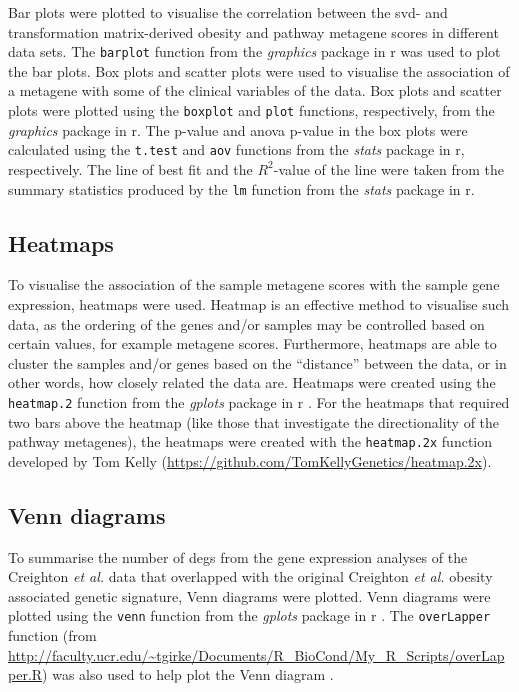 Bar plots were plotted to visualise the correlation between the \gls{svd}- and transformation matrix-derived obesity and pathway metagene scores in different data sets.
The \texttt{barplot} function from the \textit{graphics} package in \gls{r} was used to plot the bar plots.
Box plots and scatter plots were used to visualise the association of a metagene with some of the clinical variables of the data.
Box plots and scatter plots were plotted using the \texttt{boxplot} and \texttt{plot} functions, respectively, from the \textit{graphics} package in \gls{r}.
The p-value and \gls{anova} p-value in the box plots were calculated using the \texttt{t.test} and \texttt{aov} functions from the \textit{stats} package in \gls{r}, respectively.
The line of best fit and the $R^2$-value of the line were taken from the summary statistics produced by the \texttt{lm} function from the \textit{stats} package in \gls{r}.

\subsection{Heatmaps}
\label{sub:heatmaps}

To visualise the association of the sample metagene scores with the sample gene expression, heatmaps were used.
Heatmap is an effective method to visualise such data, as the ordering of the genes and/or samples may be controlled based on certain values, for example metagene scores.
Furthermore, heatmaps are able to cluster the samples and/or genes based on the ``distance'' between the data, or in other words, how closely related the data are.
Heatmaps were created using the \texttt{heatmap.2} function from the \textit{gplots} package in \gls{r} \citep{gplots}.
For the heatmaps that required two bars above the heatmap (like those that investigate the directionality of the pathway metagenes), the heatmaps were created with the \texttt{heatmap.2x} function developed by Tom Kelly (\url{https://github.com/TomKellyGenetics/heatmap.2x}).

\subsection{Venn diagrams}
\label{sub:venn_diagrams}

To summarise the number of \glspl{deg} from the gene expression analyses of the Creighton \textit{et al.} data that overlapped with the original Creighton \textit{et al.} obesity associated genetic signature, Venn diagrams were plotted.
Venn diagrams were plotted using the \texttt{venn} function from the \textit{gplots} package in \gls{r} \citep{gplots}.
The \texttt{overLapper} function (from \url{http://faculty.ucr.edu/~tgirke/Documents/R_BioCond/My_R_Scripts/overLapper.R}) was also used to help plot the Venn diagram \citep{Girke2016}.

